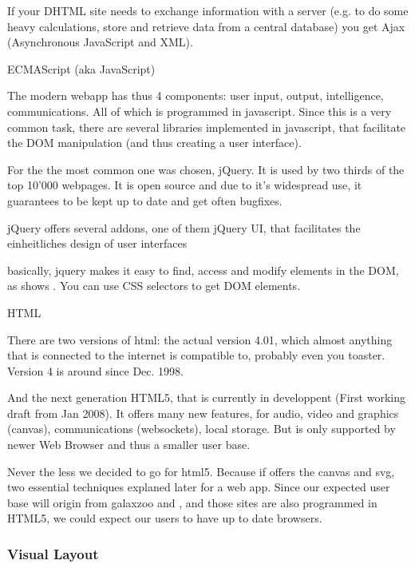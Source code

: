 If your DHTML site needs to exchange information with a server (e.g. to do some heavy calculations, store and retrieve data from a central database) you get Ajax (Asynchronous JavaScript and XML).




ECMAScript (aka JavaScript)


The modern webapp has thus 4 components: user input, output, intelligence, communications.
All of which is programmed in javascript.
Since this is a very common task, there are several libraries implemented in javascript, that facilitate the DOM manipulation (and thus creating a user interface).

For \spl the the most common one was chosen, jQuery.
It is used by two thirds of the top 10'000 webpages.
It is open source and due to it's widespread use, it guarantees to be kept up to date and get often bugfixes.

jQuery offers several addons, one of them jQuery UI, that facilitates the einheitliches design of user interfaces

basically, jquery makes it easy to find, access and modify elements in the DOM, as shows . You can use CSS selectors to get DOM elements.





HTML

There are two versions of html: the actual version 4.01, which almost anything that is connected to the internet is compatible to, probably even you toaster. Version 4 is around since Dec. 1998.

And the next generation HTML5, that is currently in developpent (First working draft from Jan 2008).
It offers many new features, for audio, video and graphics (canvas), communications (websockets), local storage.
But is only supported by newer Web Browser and thus a smaller user base.

Never the less we decided to go for html5. Because if offers the canvas and svg, two essential techniques explaned later for a web app.
Since our expected user base will origin from galaxzoo and \sw, and those sites are also programmed in HTML5, we could expect our users to have up to date browsers.



\subsubsection{Visual Layout}
\label{sec:client_vis_layout}

